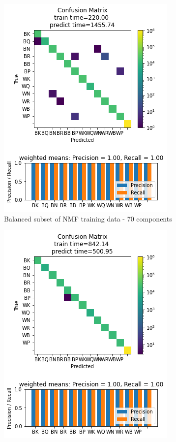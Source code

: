 \documentclass{article}
\newcommand{\NMFBL}{Balanced subset of NMF training data - 70 components}
\begin{document}
\begin{figure}[h]
\begin{subfigure}{0.33\textwidth}
\includegraphics[width=0.9\linewidth]{NN_B_NMF70c_160x160_evaluation.png} 
\caption{\NMFBL}
\end{subfigure}
\begin{subfigure}{0.33\textwidth}
\includegraphics[width=0.9\linewidth]{NN_PCA50c_160x160_evaluation.png}

\end{subfigure}
\end{figure}
\end{document}
